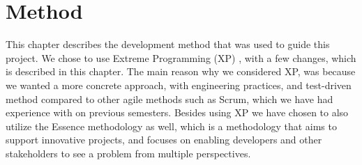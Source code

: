 
\chapter{Method}
\label{cha:method}

This chapter describes the development method that was used to guide this project. We chose to use Extreme Programming (XP) \parencite{xp}, with a few changes, which is described in this chapter. The main reason why we considered XP, was because we wanted a more concrete approach, with engineering practices, and test-driven method compared to other agile methods such as Scrum, which we have had experience with on previous semesters. Besides using XP we have chosen to also utilize the Essence methodology as well, which is a methodology that aims to support innovative projects, and focuses on enabling developers and other stakeholders to see a problem from multiple perspectives. 


